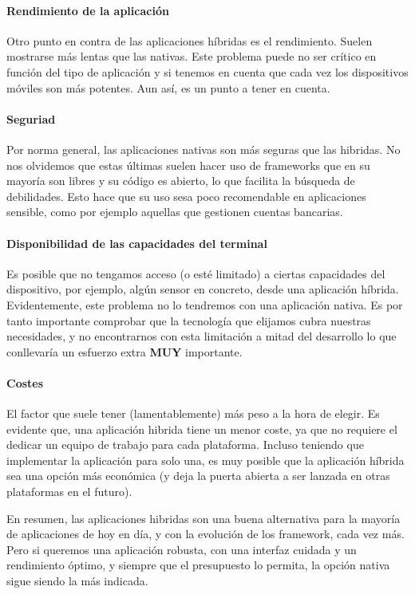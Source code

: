 \paragraph{Rendimiento de la aplicación} Otro punto en contra de las aplicaciones híbridas es el rendimiento. Suelen mostrarse más lentas que las nativas. Este problema puede no ser crítico en función del tipo de aplicación y si tenemos en cuenta que cada vez los dispositivos móviles son más potentes. Aun así, es un punto a tener en cuenta.

\paragraph{Seguriad} Por norma general, las aplicaciones nativas son más seguras que las hibridas. No nos olvidemos que estas últimas suelen hacer uso de frameworks que en su mayoría son libres y su código es abierto, lo que facilita la búsqueda de debilidades. Esto hace que su uso sesa poco recomendable en aplicaciones sensible, como por ejemplo aquellas que gestionen cuentas bancarias.

\paragraph{Disponibilidad de las capacidades del terminal} Es posible que no tengamos acceso (o esté limitado) a ciertas capacidades del dispositivo, por ejemplo, algún sensor en concreto, desde una aplicación híbrida. Evidentemente, este problema no lo tendremos con una aplicación nativa. Es por tanto importante comprobar que la tecnología que elijamos cubra nuestras necesidades, y no encontrarnos con esta limitación a mitad del desarrollo lo que conllevaría un esfuerzo extra \textbf{MUY} importante.

\paragraph{Costes} El factor que suele tener (lamentablemente) más peso a la hora de elegir. Es evidente que, una aplicación hibrida tiene un menor coste, ya que no requiere el dedicar un equipo de trabajo para cada plataforma. Incluso teniendo que implementar la aplicación para solo una, es muy posible que la aplicación híbrida sea una opción más económica (y deja la puerta abierta a ser lanzada en otras plataformas en el futuro).

En resumen, las aplicaciones hibridas son una buena alternativa para la mayoría de aplicaciones de hoy en día, y con la evolución de los framework, cada vez más. Pero si queremos una aplicación robusta, con una interfaz cuidada y un rendimiento óptimo, y siempre que el presupuesto lo permita, la opción nativa sigue siendo la más indicada.


